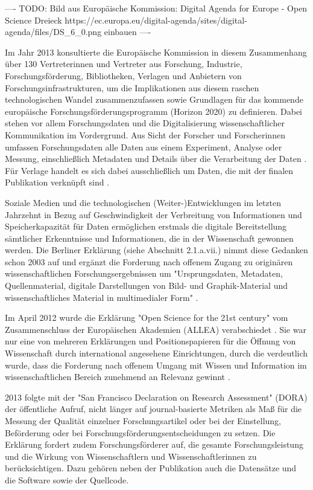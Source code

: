 ---- TODO: Bild aus Europäische Kommission: Digital Agenda for Europe - Open Science Dreieck https://ec.europa.eu/digital-agenda/sites/digital-agenda/files/DS_6_0.png einbauen ----

Im Jahr 2013 konsultierte die Europäische Kommission in diesem Zusammenhang über 130 Vertreterinnen und Vertreter aus Forschung, Industrie, Forschungsförderung, Bibliotheken, Verlagen und Anbietern von Forschungsinfrastrukturen, um die Implikationen aus diesem raschen technologischen Wandel zusammenzufassen sowie Grundlagen für das kommende europäische Forschungsförderungsprogramm (Horizon 2020) zu definieren. Dabei stehen vor allem Forschungsdaten und die Digitalisierung wissenschaftlicher Kommunikation im Vordergrund. Aus Sicht der Forscher und Forscherinnen umfassen Forschungsdaten alle Daten aus einem Experiment, Analyse oder Messung, einschließlich Metadaten und Details über die Verarbeitung der Daten \cite{eu_consult_data_2013}. Für Verlage handelt es sich dabei ausschließlich um Daten, die mit der finalen Publikation verknüpft sind \cite{eu_consult_data_2013}.

Soziale Medien und die technologischen (Weiter-)Entwicklungen im letzten Jahrzehnt in Bezug auf Geschwindigkeit der Verbreitung von Informationen und Speicherkapazität für Daten ermöglichen erstmals die digitale Bereitstellung sämtlicher Erkenntnisse und Informationen, die in der Wissenschaft gewonnen werden. Die Berliner Erklärung (siehe Abschnitt 2.1.a.vii.) nimmt diese Gedanken schon 2003 auf und ergänzt die Forderung nach offenem Zugang zu originären wissenschaftlichen Forschungsergebnissen um "Ursprungsdaten, Metadaten, Quellenmaterial, digitale Darstellungen von Bild- und Graphik-Material und wissenschaftliches Material in multimedialer Form" \cite{berliner_erklaerung_2003}.

Im April 2012 wurde die Erklärung "Open Science for the 21st century" vom Zusammenschluss der Europäischen Akademien (ALLEA) verabschiedet \cite{ALLEA_2012}. Sie war nur eine von mehreren Erklärungen und Positionspapieren für die Öffnung von Wissenschaft durch international angesehene Einrichtungen, durch die verdeutlich wurde, dass die Forderung nach offenem Umgang mit Wissen und Information im wissenschaftlichen Bereich zunehmend an Relevanz gewinnt \cite{schulze_2013_open}.

2013 folgte mit der "San Francisco Declaration on Research Assessment" (DORA) \cite{DORA_2013} der öffentliche Aufruf, nicht länger auf journal-basierte Metriken als Maß für die Messung der Qualität einzelner Forschungsartikel oder bei der Einstellung, Beförderung oder bei Forschungsförderungsentscheidungen zu setzen. Die Erklärung fordert zudem Forschungsförderer auf, die gesamte Forschungsleistung und die Wirkung von Wissenschaftlern und Wissenschaftlerinnen zu berücksichtigen. Dazu gehören neben der Publikation auch die Datensätze und die Software sowie der Quellcode.

